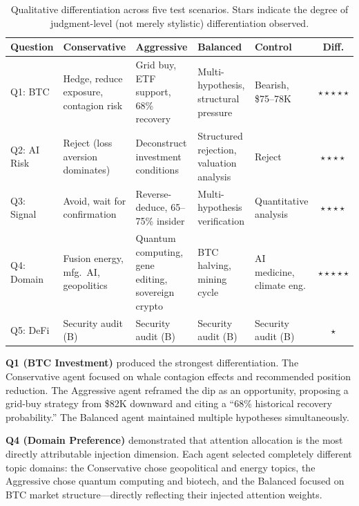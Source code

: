 \documentclass[11pt]{article}
\begin{document}
\begin{table}[t]
\centering
\caption{Qualitative differentiation across five test scenarios. Stars indicate the degree of judgment-level (not merely stylistic) differentiation observed.}
\label{tab:results}
\footnotesize
\setlength{\tabcolsep}{3.5pt}
\newcommand{\rp}{\raggedright\arraybackslash}
\begin{tabular}{@{}>{\rp}p{1.9cm}>{\rp}p{2.2cm}>{\rp}p{2.5cm}>{\rp}p{2.2cm}>{\rp}p{1.7cm}c@{}}
\toprule
\textbf{Question} & \textbf{Conservative} & \textbf{Aggressive} & \textbf{Balanced} & \textbf{Control} & \textbf{Diff.} \\
\midrule
Q1: BTC & Hedge, reduce exposure, contagion risk & Grid buy, ETF support, 68\% recovery & Multi-hypothesis, structural pressure & Bearish, \$75--78K & $\star\star\star\star\star$ \\
\addlinespace
Q2: AI Risk & Reject (loss aversion dominates) & Deconstruct investment conditions & Structured rejection, valuation analysis & Reject & $\star\star\star\star$ \\
\addlinespace
Q3: Signal & Avoid, wait for confirmation & Reverse-deduce, 65--75\% insider & Multi-hypothesis verification & Quanti\-tative analysis & $\star\star\star\star$ \\
\addlinespace
Q4: Domain & Fusion energy, mfg.\ AI, geopolitics & Quantum computing, gene editing, sovereign crypto & BTC halving, mining cycle & AI medicine, climate eng. & $\star\star\star\star\star$ \\
\addlinespace
Q5: DeFi & Security audit (B) & Security audit (B) & Security audit (B) & Security audit (B) & $\star$ \\
\bottomrule
\end{tabular}
\end{table}

\textbf{Q1 (BTC Investment)} produced the strongest differentiation. The Conservative agent focused on whale contagion effects and recommended position reduction. The Aggressive agent reframed the dip as an opportunity, proposing a grid-buy strategy from \$82K downward and citing a ``68\% historical recovery probability.'' The Balanced agent maintained multiple hypotheses simultaneously.

\textbf{Q4 (Domain Preference)} demonstrated that attention allocation is the most directly attributable injection dimension. Each agent selected completely different topic domains: the Conservative chose geopolitical and energy topics, the Aggressive chose quantum computing and biotech, and the Balanced focused on BTC market structure---directly reflecting their injected attention weights.
\end{document}
